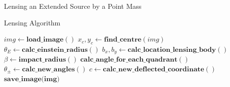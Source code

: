 \documentclass[aspectratio=1610,xcolor=dvipsnames,t]{beamer}
\begin{document}
\begin{frame}{Lensing an Extended Source by a Point Mass} 
        \begin{block}{Lensing Algorithm} 
        \begin{algorithmic}[1]
                \State $img \leftarrow \textbf{load\_image}()$
                \State $x_c, y_c \leftarrow \textbf{find\_centre}(img)$
                \State $\theta_E \leftarrow \textbf{calc\_einstein\_radius}()$
                    \State $b_x, b_y \leftarrow \textbf{calc\_location\_lensing\_body}()$
                    \State $\beta \leftarrow \textbf{impact\_radius}()$
                    \State $\textbf{calc\_angle\_for\_each\_quadrant}()$
                    \State $\theta_{\pm} \leftarrow \textbf{calc\_new\_angles}()$
                    \State $c \leftarrow \textbf{calc\_new\_deflected\_coordinate}()$
                \EndFor
                \State $\textbf{save\_image(img)}$ 
            \EndProcedure
        \end{algorithmic} 
        \end{block} 
\end{frame} 

\end{document}
